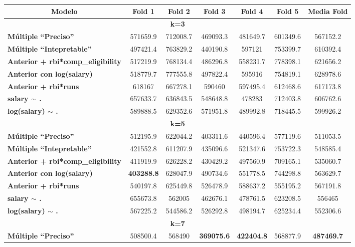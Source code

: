 \documentclass[a4paper,12pt, oneside]{book}
\begin{document}
\begin{table}[H]
\centering
\footnotesize
\begin{tabular}{@{}lcccccc@{}}
\toprule
\multicolumn{1}{c}{\textbf{Modelo}} & \textbf{Fold 1} & \textbf{Fold 2} & \textbf{Fold 3} & \textbf{Fold 4} & \textbf{Fold 5} & \textbf{Media Fold} \\ \midrule
\multicolumn{7}{c}{\textbf{k=3}} \\
\textbf{Múltiple ``Preciso''} & 571659.9 & 712008.7 & 469093.3 & 481649.7 & 601349.6 & 567152.2 \\
\textbf{Múltiple ``Intepretable''} & 497421.4 & 763829.2 & 440190.8 & 597121 & 753399.7 & 610392.4 \\
\textbf{Anterior + rbi*comp\_eligibility} & 517219.9 & 768134.4 & 486296.8 & 558231.7 & 778398.1 & 621656.2 \\
\textbf{Anterior con log(salary)} & 518779.7 & 777555.8 & 497822.4 & 595916 & 754819.1 & 628978.6 \\
\textbf{Anterior + rbi*runs} & 618167 & 667278.1 & 590460 & 597495.4 & 612468.6 & 617173.8 \\
\textbf{salary $\sim$ .} & 657633.7 & 636843.5 & 548648.8 & 478283 & 712403.8 & 606762.6 \\
\textbf{log(salary) $\sim$ .} & 589888.5 & 629352.6 & 571951.8 & 489992.8 & 718445.5 & 599926.2 \\
\multicolumn{7}{c}{\textbf{k=5}} \\
\textbf{Múltiple ``Preciso''} & 512195.9 & 622044.2 & 403311.6 & 440596.4 & 577119.6 & 511053.5 \\
\textbf{Múltiple ``Intepretable''} & 421552.8 & 611207.9 & 435096.6 & 521347.6 & 753722.3 & 548585.4 \\
\textbf{Anterior + rbi*comp\_eligibility} & 411919.9 & 626228.2 & 430429.2 & 497560.9 & 709165.1 & 535060.7 \\
\textbf{Anterior con log(salary)} & \textbf{403288.8} & 628047.9 & 490734.6 & 551778.5 & 744298.8 & 563629.7 \\
\textbf{Anterior + rbi*runs} & 540197.8 & 625449.8 & 526478.9 & 588637.2 & 555195.2 & 567191.8 \\
\textbf{salary $\sim$ .} & 655673.8 & 562005 & 462676.1 & 478761.5 & 623208.5 & 556465 \\
\textbf{log(salary) $\sim$ .} & 567225.2 & 544586.2 & 526292.8 & 498194.7 & 625234.4 & 552306.6 \\
\multicolumn{7}{c}{\textbf{k=7}} \\
\textbf{Múltiple ``Preciso''} & 508500.4 & 568490 & \textbf{369075.6} & \textbf{422404.8} & 568877.9 & \textbf{487469.7} \\

\end{tabular}
\end{table}
\end{document}
